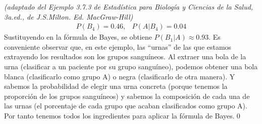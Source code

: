 \begin{itemize}
\begin{Ejemplo}{\em  (adaptado del Ejemplo 3.7.3 de  {\em Estadística para Biología y Ciencias de la Salud, 3a.ed.}, de J.S.Milton. Ed. MacGraw-Hill)}
\[\begin{array}{cc}
            P(B_4)=0.46,&P(A|B_4)=0.04
            \end{array}\]
            Sustituyendo en la fórmula de Bayes, se obtiene $P(B_1|A)\approx 0.93$. Es conveniente observar que, en este ejemplo, las ``urnas'' de las que estamos extrayendo los resultados son los grupos sanguíneos. Al extraer una bola de la urna (clasificar a un paciente por su grupo sanguíneo), podemos obtener una bola blanca (clasificarlo como grupo A) o negra (clasificarlo de otra manera). Y sabemos la probabilidad de elegir una urna concreta (porque tenemos la proporción de los grupos sanguíneos) y sabemos la composición de cada una de las urnas (el porcentaje de cada grupo que acaban clasificados como grupo A). Por tanto tenemos todos los ingredientes para aplicar la fórmula de Bayes.\qed
        \end{Ejemplo}
\end{itemize}


%
%


%
%


